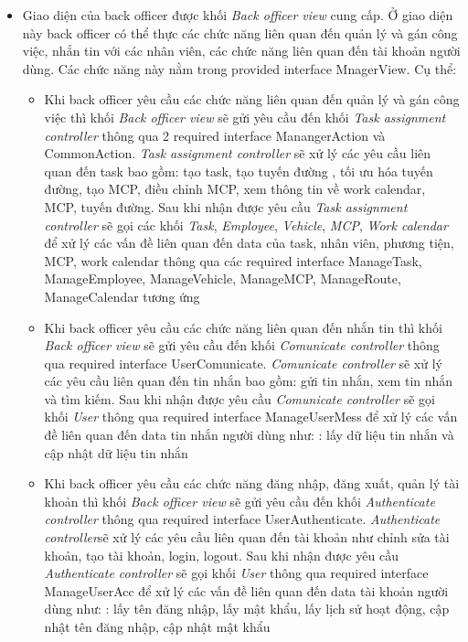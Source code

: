 \documentclass[a4paper]{article}
\begin{document}
 \begin{itemize}
     \item Giao diện của back officer được khối \textit{Back officer view} cung cấp. Ở giao diện này back officer có thể thực các chức năng liên quan đến quản lý và gán công việc, nhắn tin với các nhân viên, các chức năng liên quan đến tài khoản người dùng. Các chức năng này nằm trong provided interface MnagerView. Cụ thể:
     \begin{itemize}
         \item Khi back officer yêu cầu các chức năng liên quan đến quản lý và gán công việc thì khối \textit{Back officer view} sẽ gửi yêu cầu đến khối  \textit{Task assignment controller} thông qua 2 required interface ManangerAction và CommonAction. \textit{Task assignment controller} sẽ xử lý các yêu cầu liên quan đến task bao gồm: tạo task, tạo tuyến đường , tối ưu hóa tuyến đường, tạo MCP, điều chỉnh MCP, xem thông tin về work calendar, MCP, tuyến đường. Sau khi nhận được yêu cầu \textit{Task assignment controller} sẽ gọi các khối \textit{Task}, \textit{Employee}, \textit{Vehicle}, \textit{MCP}, \textit{Work calendar} để xử lý các vấn đề liên quan đến data của task, nhân viên, phương tiện, MCP, work calendar thông qua các required interface ManageTask, ManageEmployee, ManageVehicle, ManageMCP, ManageRoute, ManageCalendar tương ứng
         \item Khi  back officer yêu cầu các chức năng liên quan đến nhắn tin thì khối \textit{Back officer view} sẽ gửi yêu cầu đến khối  \textit{Comunicate controller} thông qua required interface UserComunicate. \textit{Comunicate controller} sẽ xử lý các yêu cầu liên quan đến tin nhắn bao gồm:  gửi tin nhắn, xem tin nhắn và tìm kiếm. Sau khi nhận được yêu cầu \textit{Comunicate controller} sẽ gọi  khối  \textit{User}  thông qua required interface ManageUserMess để xử lý các vấn đề liên quan đến data tin nhắn người dùng như: : lấy dữ liệu tin nhắn và cập nhật dữ liệu tin nhắn
         \item Khi  back officer yêu cầu các chức năng đăng nhập, đăng xuất, quản lý tài khoản thì khối \textit{Back officer view} sẽ gửi yêu cầu đến khối  \textit{Authenticate controller} thông qua required interface UserAuthenticate. \textit{Authenticate controller}sẽ xử lý các yêu cầu liên quan đến tài khoản như  chỉnh sửa tài khoản, tạo tài khoản, login, logout. Sau khi nhận được yêu cầu \textit{Authenticate controller } sẽ gọi  khối  \textit{User} thông qua required interface ManageUserAcc để xử lý các vấn đề liên quan đến data tài khoản người dùng như: : lấy tên đăng nhập, lấy mật khẩu, lấy lịch sử hoạt động, cập nhật tên đăng nhập, cập nhật mật khẩu
         

\end{itemize}
\end{itemize}
\end{document}
